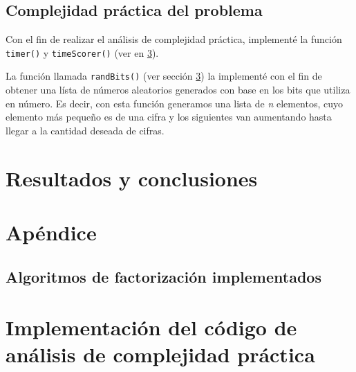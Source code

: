\documentclass{article}
\begin{document}
\subsection{Complejidad práctica del problema}

Con el fin de realizar el análisis de complejidad práctica, implementé la
función \texttt{timer()} y \texttt{timeScorer()} (ver en \ref{sec:complejidad}).

La función llamada \texttt{randBits()} (ver sección \ref{sec:complejidad}) la
implementé con el fin de obtener una lísta de números aleatorios generados con
base en los bits que utiliza en número. Es decir, con esta función generamos una
lista de \textit{n} elementos, cuyo elemento más pequeño es de una cifra y los
siguientes van aumentando hasta llegar a la cantidad deseada de cifras.


\section{Resultados y conclusiones}



 


\pagebreak
\section{Apéndice}

\subsection{Algoritmos de factorización implementados} \label{sec:algoritmos}



\pagebreak

\section{Implementación del código de análisis de complejidad práctica} \label{sec:complejidad}



%
\end{document}
